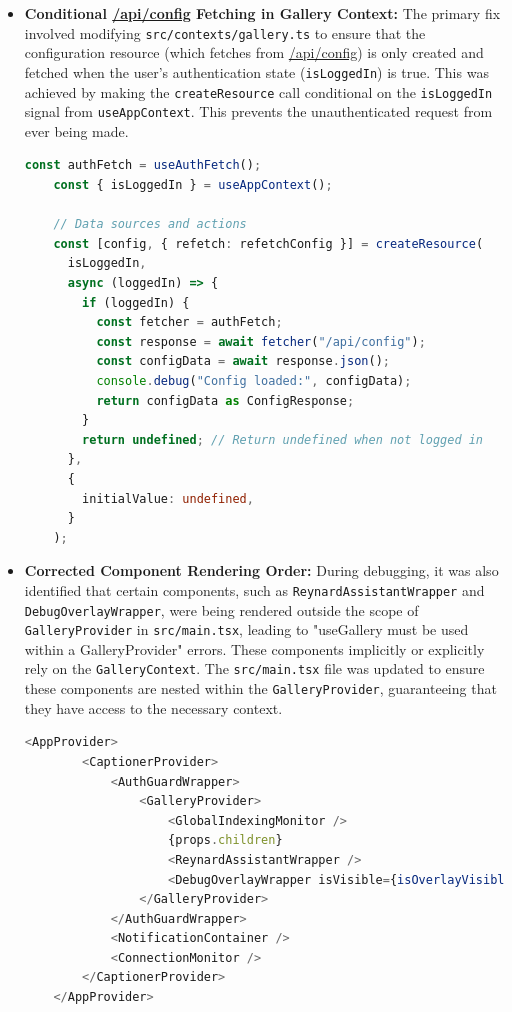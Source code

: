 \documentclass{article}
\begin{document}
\begin{itemize}
    \item \textbf{Conditional \url{/api/config} Fetching in Gallery Context:}
    The primary fix involved modifying \texttt{src/contexts/gallery.ts} to ensure that the configuration resource (which fetches from \url{/api/config}) is only created and fetched when the user's authentication state (\texttt{isLoggedIn}) is true. This was achieved by making the \texttt{createResource} call conditional on the \texttt{isLoggedIn} signal from \texttt{useAppContext}. This prevents the unauthenticated request from ever being made.

    \begin{lstlisting}[language=TypeScript, caption=Conditional Config Resource Creation in \texttt{src/contexts/gallery.ts}]
    const authFetch = useAuthFetch();
    const { isLoggedIn } = useAppContext();

    // Data sources and actions
    const [config, { refetch: refetchConfig }] = createResource(
      isLoggedIn,
      async (loggedIn) => {
        if (loggedIn) {
          const fetcher = authFetch;
          const response = await fetcher("/api/config");
          const configData = await response.json();
          console.debug("Config loaded:", configData);
          return configData as ConfigResponse;
        }
        return undefined; // Return undefined when not logged in
      },
      {
        initialValue: undefined,
      }
    );
    \end{lstlisting}

    \item \textbf{Corrected Component Rendering Order:}
    During debugging, it was also identified that certain components, such as \texttt{ReynardAssistantWrapper} and \texttt{DebugOverlayWrapper}, were being rendered outside the scope of \texttt{GalleryProvider} in \texttt{src/main.tsx}, leading to "useGallery must be used within a GalleryProvider" errors. These components implicitly or explicitly rely on the \texttt{GalleryContext}. The \texttt{src/main.tsx} file was updated to ensure these components are nested within the \texttt{GalleryProvider}, guaranteeing that they have access to the necessary context.

    \begin{lstlisting}[language=TypeScript, caption=Updated Component Hierarchy in \texttt{src/main.tsx}]
    <AppProvider>
        <CaptionerProvider>
            <AuthGuardWrapper>
                <GalleryProvider>
                    <GlobalIndexingMonitor />
                    {props.children}
                    <ReynardAssistantWrapper />
                    <DebugOverlayWrapper isVisible={isOverlayVisible()} />
                </GalleryProvider>
            </AuthGuardWrapper>
            <NotificationContainer />
            <ConnectionMonitor />
        </CaptionerProvider>
    </AppProvider>
    \end{lstlisting}
\end{itemize}
\end{document}
